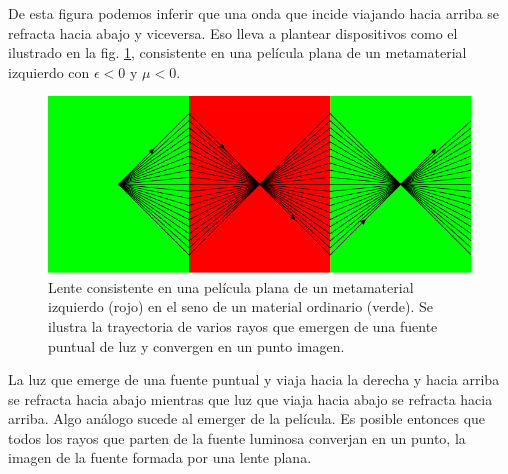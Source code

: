 \documentclass[12pt]{article}
\begin{document}
De esta figura podemos inferir que una onda que incide viajando hacia
arriba se refracta hacia abajo y viceversa. Eso lleva a plantear
dispositivos como el ilustrado en la fig. \ref{fig:lenteplana},
consistente en una película plana de un metamaterial izquierdo con
$\epsilon<0$ y $\mu<0$.
\begin{figure}
  \centering
  \includegraphics{fig10}
  \caption{Lente consistente en una película plana de un metamaterial
    izquierdo (rojo) en el seno de un material ordinario (verde). Se
    ilustra la trayectoria de varios rayos que emergen de una fuente
    puntual de luz y convergen en un punto imagen. }
  \label{fig:lenteplana}
\end{figure}
La luz que emerge de una fuente puntual y viaja hacia la derecha y
hacia arriba se refracta hacia abajo mientras que luz que viaja hacia
abajo se refracta hacia arriba. Algo análogo sucede al emerger de la
película. Es posible entonces que todos los rayos que parten de la
fuente luminosa converjan en un punto, la imagen de la fuente formada
por una lente plana.
\end{document}
